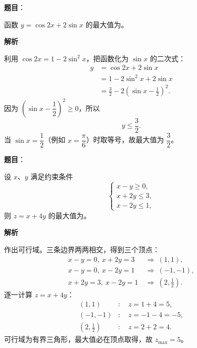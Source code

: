\begin{answer}

\textbf{题目}：

函数 $y=\cos2x+2\sin x$ 的最大值为\gkblank{}。

\textbf{解析}

利用 $\cos2x=1-2\sin^2x$，把函数化为 $\sin x$ 的二次式：
\nopagebreak[4]
\[\begin{aligned}
y&=\cos2x+2\sin x\\
&=1-2\sin^2x+2\sin x\\
&=\frac32-2\left(\sin x-\frac12\right)^2.
\end{aligned}\]
因为 $\left(\sin x-\dfrac12\right)^2\geqslant0$，所以
\nopagebreak[4]
\[y\leqslant\frac32.\]
当 $\sin x=\dfrac12$（例如 $x=\dfrac{\pi}{6}$）时取等号，故最大值为 $\dfrac32$。


\end{answer}
\begin{answer}

\textbf{题目}：

设 $x$、$y$ 满足约束条件
\nopagebreak[4]
\[\begin{cases}
x-y\geqslant 0,\\
x+2y\leqslant 3,\\
x-2y\leqslant 1,
\end{cases}\]
则 $z=x+4y$ 的最大值为\gkblank{}。

\textbf{解析}

作出可行域。三条边界两两相交，得到三个顶点：
\nopagebreak[4]
\[\begin{aligned}
x-y=0,\ x+2y=3&\ \Longrightarrow\ (1,1),\\
x-y=0,\ x-2y=1&\ \Longrightarrow\ (-1,-1),\\
x+2y=3,\ x-2y=1&\ \Longrightarrow\ \left(2,\frac12\right).
\end{aligned}\]
逐一计算 $z=x+4y$：
\nopagebreak[4]
\[\begin{aligned}
(1,1)&:\quad z=1+4=5,\\
(-1,-1)&:\quad z=-1-4=-5,\\
\left(2,\frac12\right)&:\quad z=2+2=4.
\end{aligned}\]
可行域为有界三角形，最大值必在顶点取得，故 $z_{\max}=5$。


\end{answer}
